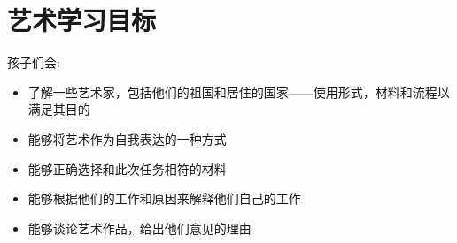 \chapter{艺术学习目标}

孩子们会:\par

\begin{itemize}
  \item 了解一些艺术家，包括他们的祖国和居住的国家——使用形式，材料和流程以满足其目的
  \item 能够将艺术作为自我表达的一种方式
  \item 能够正确选择和此次任务相符的材料
  \item 能够根据他们的工作和原因来解释他们自己的工作
  \item 能够谈论艺术作品，给出他们意见的理由
\end{itemize}

